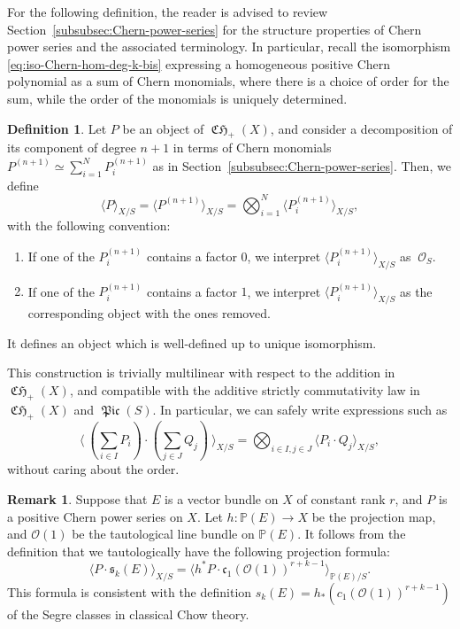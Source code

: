 \documentclass[JEP,XML,SOM,Unicode,published]{cedram}
\theoremstyle{plain}
\theoremstyle{definition}
\newtheorem{definition}[theorem]{Definition}
\newtheorem{remark}[theorem]{Remark}
\newcommand{\PBbb}{\mathbb P}
\newcommand{\Ocal}{\mathcal O}
\newcommand{\cfrak}{\mathfrak c}
\newcommand{\sfrak}{\mathfrak s}
\DeclareMathOperator{\CHfrak}{\mathfrak{CH}}
\DeclareMathOperator{\Picfr}{\mathfrak{Pic}}
\begin{document}
For the following definition, the reader is advised to review Section~\ref{subsubsec:Chern-power-series} for the structure properties of Chern power series and the associated terminology. In particular, recall the isomorphism \eqref{eq:iso-Chern-hom-deg-k-bis} expressing a homogeneous positive Chern polynomial as a sum of Chern monomials, where there is a choice of order for the sum, while the order of the monomials is uniquely determined.

\begin{definition}\label{def:Elkik-intersection-Chern-power}
Let $P$ be an object of $\CHfrak_{+}(X)$, and consider a decomposition of its component of degree $n+1$ in terms of Chern monomials $P^{(n+1)}\simeq\sum_{i=1}^{N}P_{i}^{(n+1)}$ as in Section~\ref{subsubsec:Chern-power-series}. Then, we define
\begin{displaymath}
\langle P\rangle_{X/S}=\langle P^{(n+1)}\rangle_{X/S}=\bigotimes_{i=1}^{N}\langle P_{i}^{(n+1)}\rangle_{X/S},
\end{displaymath}
with the following convention:
\begin{enumerate}
\item If one of the $P_{i}^{(n+1)}$ contains a factor $0$, we interpret $\langle P_{i}^{(n+1)} \rangle_{X/S} $ as $\ \Ocal_S$.
\item If one of the $P_{i}^{(n+1)}$ contains a factor $1$, we interpret $\langle P_{i}^{(n+1)} \rangle_{X/S} $ as the corresponding object with the ones removed.
\end{enumerate}
It defines an object which is well-defined up to unique isomorphism.

\end{definition}
This construction is trivially multilinear with respect to the addition in $\CHfrak_{+}(X)$, and compatible with the additive strictly commutativity law in $\CHfrak_{+}(X)$ and $\Picfr(S)$. In particular, we can safely write expressions such as
\begin{displaymath}
\langle\ (\sum_{i\in I} P_{i})\cdot (\sum_{j\in J}Q_{j})\ \rangle_{X/S}=\bigotimes_{i \in I,j \in J}\langle P_{i}\cdot Q_{j}\rangle_{X/S},
\end{displaymath}
without caring about the order.

\begin{remark}\label{rmk:taut-proj-form}
Suppose that $E$ is a vector bundle on $X$ of constant rank $r$, and $P$ is a positive Chern power series on $X$. Let $h\colon\PBbb(E)\to X$ be the projection map, and $\Ocal(1)$ be the tautological line bundle on $\PBbb(E)$. It follows from the definition that we tautologically have the following projection formula:
\begin{displaymath}
\langle P \cdot \sfrak_k(E) \rangle_{X/S} = \langle h^{\ast}P \cdot \cfrak_1(\Ocal(1))^{r+k-1} \rangle_{\PBbb(E)/S}.
\end{displaymath}
This formula is consistent with the definition $s_k(E) = h_\ast (c_1(\Ocal(1))^{r+k-1})$ of the Segre classes in classical Chow theory.
\end{remark}
\end{document}
